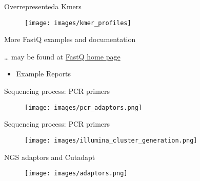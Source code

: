 \begin{frame}{Overrepresenteda Kmers}

\begin{figure}[htbp]
\centering
\texttt{[image: images/kmer\_profiles]}
\caption{}
\end{figure}

\end{frame}

\begin{frame}{More FastQ examples and documentation}

\ldots{} may be found at
\href{http://www.bioinformatics.babraham.ac.uk/projects/fastqc/}{FastQ
home page}

\begin{itemize}
\itemsep1pt\parskip0pt
\item
  Example Reports
\end{itemize}

\end{frame}

\begin{frame}{Sequencing process: PCR primers}

\begin{figure}[htbp]
\centering
\texttt{[image: images/pcr\_adaptors.png]}
\caption{}
\end{figure}

\end{frame}

\begin{frame}{Sequencing process: PCR primers}

\begin{figure}[htbp]
\centering
\texttt{[image: images/illumina\_cluster\_generation.png]}
\caption{}
\end{figure}

\end{frame}

\begin{frame}{NGS adaptors and Cutadapt}

\begin{figure}[htbp]
\centering
\texttt{[image: images/adaptors.png]}
\caption{}
\end{figure}

\end{frame}

